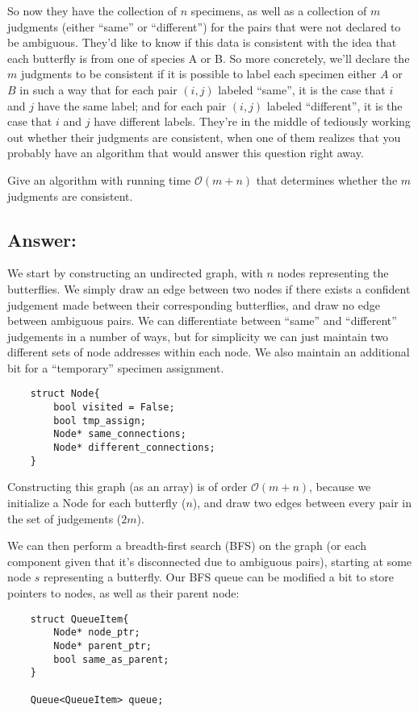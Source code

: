 \documentclass[12pt, letterpaper]{article}
\begin{document}
So now they have the collection of $n$ specimens, as well as a collection of $m$ judgments (either “same” or “different”) for the pairs that were not declared to be ambiguous. They'd like to know if this data is consistent with the idea that each butterfly is from one of species A or B. So more concretely, we'll declare the $m$ judgments to be consistent if it is possible to label each specimen either $A$ or $B$ in such a way that for each pair $(i, j)$ labeled “same”, it is the case that $i$ and $j$ have the same label; and for each pair $(i, j)$ labeled “different”, it is the case that $i$ and $j$ have different labels. 
They're in the middle of tediously working out whether their judgments are consistent, when one of them realizes that you probably have an algorithm that would answer this question right away.

Give an algorithm with running time $\mathcal{O}(m + n)$ that determines whether the $m$ judgments are consistent.

\clearpage
\subsection*{Answer:}
We start by constructing an undirected graph, with $n$ nodes representing the butterflies. 
We simply draw an edge between two nodes if there exists a confident judgement made between their corresponding butterflies, and draw no edge between ambiguous pairs.
We can differentiate between ``same'' and ``different'' judgements in a number of ways, but for simplicity we can just maintain two different sets of node addresses within each node.
We also maintain an additional bit for a ``temporary'' specimen assignment.

\begin{verbatim}
    struct Node{
        bool visited = False;
        bool tmp_assign;
        Node* same_connections;
        Node* different_connections;
    }
\end{verbatim}
Constructing this graph (as an array) is of order $\mathcal{O}(m + n)$, because we initialize a Node for each butterfly ($n$), and draw two edges between every pair in the set of judgements ($2m$).

We can then perform a breadth-first search (BFS) on the graph (or each component given that it's disconnected due to ambiguous pairs), starting at some node $s$ representing a butterfly.
Our BFS queue can be modified a bit to store pointers to nodes, as well as their parent node:
\begin{verbatim}
    struct QueueItem{
        Node* node_ptr;
        Node* parent_ptr;
        bool same_as_parent;
    }
    
    Queue<QueueItem> queue;
\end{verbatim}
\end{document}
